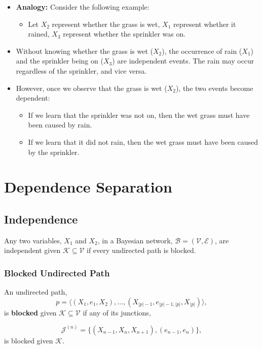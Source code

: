 \begin{notes}
    \begin{itemize}
        \item \textbf{Analogy:} Consider the following example:
        \begin{itemize}
            \item Let $X_2$ represent whether the grass is wet, $X_1$ represent whether it rained, $X_3$ represent whether the sprinkler was on.
        \end{itemize}
        \item Without knowing whether the grass is wet ($X_2$), the occurrence of rain ($X_1$) and the sprinkler being on ($X_3$) are independent events. The rain may occur regardless of the sprinkler, and vice versa.
        \item However, once we observe that the grass is wet ($X_2$), the two events become dependent:
        \begin{itemize}
            \item If we learn that the sprinkler was not on, then the wet grass must have been caused by rain.
            \item If we learn that it did not rain, then the wet grass must have been caused by the sprinkler.
        \end{itemize}
    \end{itemize}
\end{notes}
\newpage

\section{Dependence Separation}
\subsection{Independence}
\begin{theorem}
    Any two variables, $X_1$ and $X_2$, in a Bayesian network, $\mathcal{B} = (\mathcal{V}, \mathcal{E})$, are independent given $\mathcal{K} \subseteq \mathcal{V}$ if every undirected path is blocked.
\end{theorem}

\subsubsection{Blocked Undirected Path}
\begin{definition}
    An undirected path,
    \[
    p = \langle (X_1, e_1, X_2), \dots, (X_{|p|-1}, e_{|p|-1,|p|}, X_{|p|}) \rangle,
    \]
    is \textbf{blocked} given $\mathcal{K} \subseteq \mathcal{V}$ if any of its junctions,

    \[
    \mathcal{J}^{(n)} = \{(X_{n-1}, X_n, X_{n+1}), (e_{n-1}, e_n)\},
    \]
    is blocked given $\mathcal{K}$.
\end{definition}

